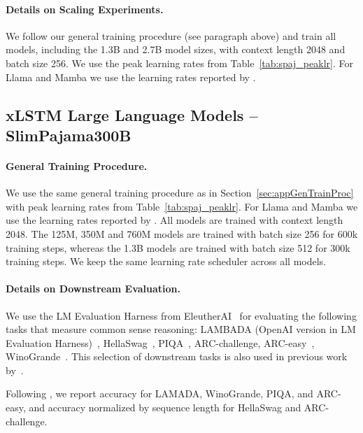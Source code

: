 \documentclass[dvipsnames]{article}
\begin{document}
\begin{appendix}
\paragraph{Details on Scaling Experiments.}
We follow our general training procedure (see paragraph above) 
and train all models, including the 1.3B and 2.7B model sizes,
with context length 2048 and batch size 256. 
We use the peak learning rates from Table~\ref{tab:spaj_peaklr}.
For Llama and Mamba we use the learning rates reported by \citet{Gu:24arxiv}.



\subsection{xLSTM Large Language Models -- SlimPajama300B}
\label{sec:appExpLanguage}

\paragraph{General Training Procedure.}
We use the same general training procedure as in Section~\ref{sec:appGenTrainProc} with peak learning rates from Table~\ref{tab:spaj_peaklr}. 
For Llama and Mamba we use the learning rates reported by \citet{Gu:24arxiv}.
All models are trained with context length 2048. 
The 125M, 350M and 760M models are trained with batch size 256 for 600k training steps, whereas the 1.3B models are trained with batch size 512 for 300k training steps. 
We keep the same learning rate scheduler across all models.


\paragraph{Details on Downstream Evaluation.} 
We use the LM Evaluation Harness from EleutherAI~\citep{Sutawika:23short} for evaluating the following tasks that measure common sense reasoning: 
LAMBADA (OpenAI version in LM Evaluation Harness)~\citep{Paperno:16}, HellaSwag~\citep{Zellers:19}, PIQA~\citep{Bisk:20}, ARC-challenge, ARC-easy~\citep{Clark:18arxiv}, WinoGrande~\citep{Sakaguchi:21}.
This selection of downstream tasks is also used in
previous work by~\citet{Gu:24arxiv}.

Following \citet{Gu:24arxiv}, we report accuracy for LAMADA, WinoGrande, PIQA, and ARC-easy, and accuracy normalized by sequence length for HellaSwag and ARC-challenge.


\end{appendix}
\end{document}
